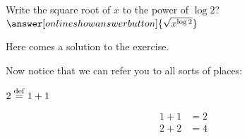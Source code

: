 \documentclass{ximera}
\begin{document}
\begin{exercise}
\begin{question}
        Write the square root of $x$ to the power of $\log 2$?  $\answer[onlineshowanswerbutton]{\sqrt{x^{\log 2}}}$
		\begin{solution}[show]
			Here comes a solution to the exercise.
		\end{solution}
	\end{question}
\end{exercise}


Now notice that we can refer you to all sorts of places: 
\begin{definition}\label{itm:showCase:def1} $2 \overset{\mathrm{def}}{=} 1+1$
\end{definition}	

\begin{align}
 1 + 1 & = 2 \label{links_test1} \\
 2 + 2 & = 4 \label{links_test2}
\end{align}
\end{document}

